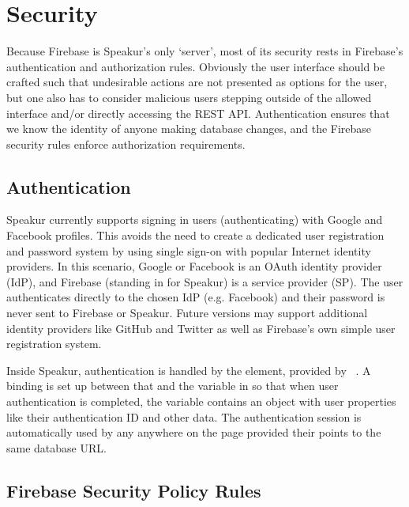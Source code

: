 \section{Security}
\label{sec:security}
Because Firebase is Speakur's only `server', 
most of its security rests in Firebase's authentication and authorization rules.
Obviously the user interface should be crafted such that undesirable actions are not presented as options for the user,
but one also has to consider malicious users stepping outside of the allowed interface
and/or directly accessing the REST API.
Authentication ensures that we know the identity of anyone making database changes,
and the Firebase security rules enforce authorization requirements.

\subsection{Authentication}
Speakur currently supports signing in users (authenticating) with Google and Facebook profiles.
This avoids the need to create a dedicated user registration and password system by using single sign-on with popular Internet identity providers.
In this scenario, Google or Facebook is an OAuth identity provider (IdP),
and Firebase (standing in for Speakur) is a service provider (SP).
The user authenticates directly to the chosen IdP (e.g. Facebook) and their password is never sent to Firebase or Speakur.
Future versions may support additional identity providers like GitHub and Twitter as well as Firebase's own simple user registration system.

Inside Speakur, authentication is handled by the  element, provided by ~\cite{polymercontributors2015-c}.
A binding is set up between that and the  variable in  so that when user authentication is completed, the  variable contains an object with user properties like their authentication ID and other data.
The authentication session is automatically used by any  anywhere on the page provided their  points to the same database URL.

\subsection{Firebase Security Policy Rules}
\label{sec:fbsecurity}

